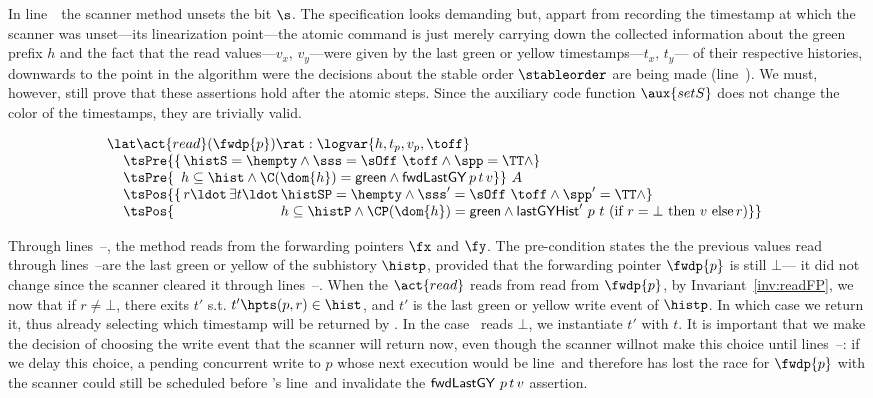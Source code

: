 In line~\lineScanUnsetsS\ the scanner method unsets the bit $\s$. The
specification looks demanding but, appart from recording the timestamp
at which the scanner was unset---\ie its linearization point---the
atomic command is just merely carrying down the collected information
about the green prefix $h$ and the fact that the read values---$v_x,\,
v_y$---were given by the last green or yellow timestamps---$t_x,\,
t_y$--- of their respective histories, downwards to the point in the
algorithm were the decisions about the stable order $\stableorder$ are
being made (line~\lineScanRelinks). We must, however, still prove that
these assertions hold after the atomic steps. Since the auxiliary
code function $\aux{setS}$ does not change the color of the
timestamps, they are trivially valid.

\[
\begin{array}{l}
  \lat \act{read}(\fwdp{p}) \rat : \logvar{h,t_p,v_p, \toff} \\
~~  \begin{array}[t]{l}
    \tsPre{\{\, \histS = \hempty \wedge \sss = \sOff\ \toff \wedge
      \spp = \TT \wedge }\\
    \tsPre{\hphantom{\{}
      h \subseteq \hist \wedge
      \C(\dom{h}) = \mathsf{green} \wedge
      \botLGY\, p\, t\, v\}}\ A\\
    \tsPos{\{\,r\ldot\, \exists t\ldot\, \histSP = \hempty \wedge
      \sss' = \sOff\ \toff \wedge \spp' = \TT \wedge }\\
    \tsPos{\phantom{\{\,r\ldot\, \exists t\ldot}\,
      h \subseteq \histP \wedge
      \CP(\dom{h}) = \mathsf{green} \wedge
      \histLGY'\ p\ t\
         (\textrm{if}\ r = \bot\
          \textrm{then}\ v\ \textrm{else}\, r)\}}
  \end{array}
\end{array}
\]

Through lines~\lineScanReadsFX--\lineScanReadsFY, the \jyscan method
reads from the forwarding pointers $\fx$ and $\fy$. The pre-condition
states the the previous values read through
lines~\lineScanReadsX--\lineScanReadsY are the last green or yellow of
the subhistory $\histp$, provided that the forwarding pointer
$\fwdp{p}$ is still $\bot$--- \ie it did not change since the scanner
cleared it through lines~\lineScanClearsX--\lineScanClearsY. When the
$\act{read}$ reads from read from $\fwdp{p}$, by
Invariant~\ref{inv:readFP}, we now that if $r \neq \bot$, there exits
$t'$ s.t. $t' \hpts (p,r) \in \hist$, and $t'$ is the last green or
yellow write event of $\histp$. In which case we return it, thus
already selecting which timestamp will be returned by \jyscan. In the
case \jyscan\ reads $\bot$, we instantiate $t'$ with $t$. It is
important that we make the decision of choosing the write event that
the scanner will return now, even though the scanner willnot make this
choice until lines~\lineScanChoosesRX--\lineScanChoosesRY: if we delay
this choice, a pending concurrent write to $p$ whose next execution
would be line~\lineWrtFwd and therefore has lost the race for
$\fwdp{p}$ with the scanner could still be scheduled before \jyscan's
line~\lineScanRelinks and invalidate the ${\mathsf{fwdLastGY}}\ p\, t\, v$
assertion.

